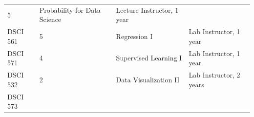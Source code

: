 \documentclass[]{article}
\begin{document}
\begin{longtable}[]{@{}llll@{}}
\begin{minipage}[t]{0.29\columnwidth}
5\strut
\end{minipage} & \begin{minipage}[t]{0.13\columnwidth}\raggedright
Probability for Data Science\strut
\end{minipage} & \begin{minipage}[t]{0.25\columnwidth}\raggedright
Lecture Instructor, 1 year\strut
\end{minipage}\tabularnewline
\begin{minipage}[t]{0.21\columnwidth}\raggedright
DSCI 561\strut
\end{minipage} & \begin{minipage}[t]{0.29\columnwidth}\raggedright
5\strut
\end{minipage} & \begin{minipage}[t]{0.13\columnwidth}\raggedright
Regression I\strut
\end{minipage} & \begin{minipage}[t]{0.25\columnwidth}\raggedright
Lab Instructor, 1 year\strut
\end{minipage}\tabularnewline
\begin{minipage}[t]{0.21\columnwidth}\raggedright
DSCI 571\strut
\end{minipage} & \begin{minipage}[t]{0.29\columnwidth}\raggedright
4\strut
\end{minipage} & \begin{minipage}[t]{0.13\columnwidth}\raggedright
Supervised Learning I\strut
\end{minipage} & \begin{minipage}[t]{0.25\columnwidth}\raggedright
Lab Instructor, 1 year\strut
\end{minipage}\tabularnewline
\begin{minipage}[t]{0.21\columnwidth}\raggedright
DSCI 532\strut
\end{minipage} & \begin{minipage}[t]{0.29\columnwidth}\raggedright
2\strut
\end{minipage} & \begin{minipage}[t]{0.13\columnwidth}\raggedright
Data Visualization II\strut
\end{minipage} & \begin{minipage}[t]{0.25\columnwidth}\raggedright
Lab Instructor, 2 years\strut
\end{minipage}\tabularnewline
\begin{minipage}[t]{0.21\columnwidth}\raggedright
DSCI 573\strut
\end{minipage} & \begin{minipage}[t]{0.29\columnwidth}\raggedright

\end{minipage}
\end{longtable}
\end{document}
